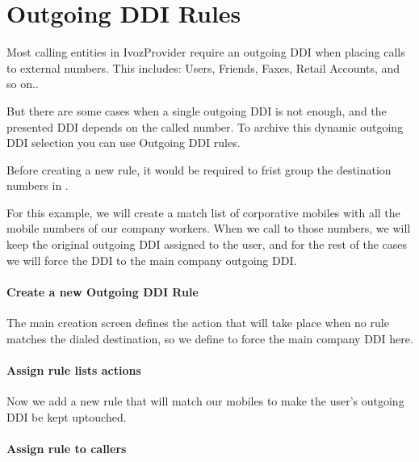 \documentclass[letterpaper,10pt,english]{sphinxmanual}
\begin{document}
\section{Outgoing DDI Rules}
\label{company/outgoingddi_rules:outgoing-ddi-rules}\label{company/outgoingddi_rules:outgoingddi-rules}\label{company/outgoingddi_rules::doc}
Most calling entities in IvozProvider require an outgoing DDI when placing calls
to external numbers. This includes: Users, Friends, Faxes, Retail Accounts, and
so on..

But there are some cases when a single outgoing DDI is not enough, and the
presented DDI depends on the called number. To archive this dynamic outgoing DDI
selection you can use Outgoing DDI rules.

Before creating a new rule, it would be required to frist group the destination
numbers in {\hyperref[company/match_lists:match\string-lists]{}}.

For this example, we will create a match list of corporative mobiles with all
the mobile numbers of our company workers. When we call to those numbers, we
will keep the original outgoing DDI assigned to the user, and for the rest of
the cases we will force the DDI to the main company outgoing DDI.
\paragraph{Create a new Outgoing DDI Rule}

The main creation screen defines the action that will take place when no rule
matches the dialed destination, so we define to force the main company DDI here.

\paragraph{Assign rule lists actions}

Now we add a new rule that will match our mobiles to make the user's outgoing
DDI be kept uptouched.

\paragraph{Assign rule to callers}
\end{document}
